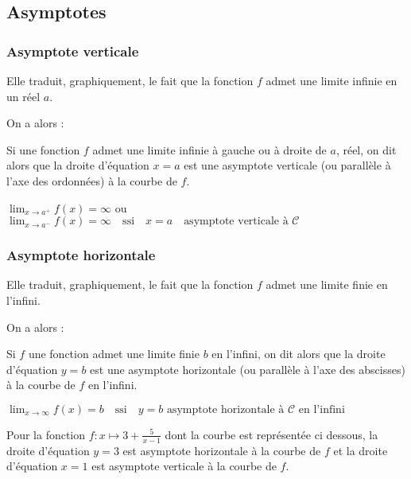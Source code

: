 \subsection{Asymptotes}
\subsubsection{Asymptote verticale}
Elle traduit, graphiquement, le fait que la fonction $f$ admet une limite infinie en un réel $a$.

On a alors :

\begin{definition}
Si  une fonction $f$ admet une limite infinie à gauche ou à droite de $a$, réel, on dit alors que la droite d'équation $x=a$ est une asymptote verticale (ou parallèle à l'axe des ordonnées)  à la courbe de $f$.

$\lim_{x \to a^{+}}f(x)=\infty$  ou 
$\lim_{x \to a^{-}}f(x)=\infty\quad \text{ssi}\quad x=a \quad\text{asymptote verticale à }\mathcal{C} $
\end{definition}



\subsubsection{Asymptote horizontale}
Elle traduit, graphiquement, le fait que la fonction $f$ admet une limite finie en l'infini.

On a alors :

\begin{definition}
Si $f$ une fonction admet une limite finie $b$ en l'infini, on dit alors que la droite d'équation $y=b$ est une asymptote horizontale (ou parallèle à l'axe des abscisses) à la courbe de $f$ en l'infini.

$ \lim_{x \to \infty}f(x)=b \quad\textrm{ssi}\quad y=b \text{ asymptote horizontale à }\mathcal{C} \text{ en l'infini}$
\end{definition}

\begin{example}
Pour la fonction $f : x\mapsto 3+ \frac{5}{x-1} $ dont la courbe est représentée ci dessous,
la droite d'équation   $y = 3 $ est asymptote horizontale à la courbe de $f$
et la droite d'équation $x = 1$ est asymptote verticale à la courbe de $f.$

\end{example}

